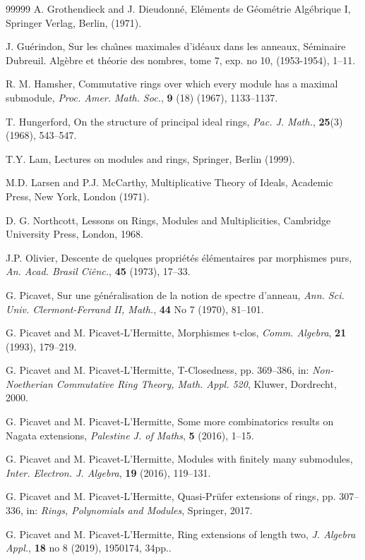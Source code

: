 \documentclass[12pt,leqno]{amsart}
\theoremstyle{definition}
\begin{document}
\begin{thebibliography}{99999}
 A. Grothendieck and J. Dieudonn\'e, El\'ements de G\'eom\'etrie Alg\'ebrique I, Springer Verlag, Berlin, (1971).

 J. Gu\'erindon, Sur les cha\^\i nes maximales d'id\'eaux dans les anneaux, S\'eminaire Dubreuil. Alg\`ebre et th\'eorie des nombres,  tome 7, exp. no 10, (1953-1954), 1--11.

 R. M. Hamsher, Commutative rings over which every module has a maximal submodule, {\it Proc. Amer. Math. Soc.}, {\bf 9} (18) (1967), 1133--1137.

 T. Hungerford, On the structure of principal ideal rings, {\it Pac. J. Math.}, {\bf 25}(3) (1968), 543--547.

 T.Y. Lam, Lectures on modules and rings, Springer, Berlin  (1999).

 M.D. Larsen and P.J. McCarthy, Multiplicative Theory of  Ideals, Academic Press, New York, London (1971).

 D. G. Northcott, Lessons on Rings, Modules and Multiplicities, Cambridge University Press, London, 1968.

 J.P. Olivier, Descente de quelques propri\'et\'es 
\'el\'ementaires par morphismes purs, {\it An. Acad. Brasil Ci\^enc.}, {\bf 45}  (1973), 17--33.

 G. Picavet, Sur une g\'en\'eralisation de la notion de spectre  d'anneau, {\it Ann. Sci. Univ. Clermont-Ferrand II, Math.}, {\bf 44}  No 7 (1970), 81--101. 

 G. Picavet and M. Picavet-L'Hermitte, Morphismes t-clos, {\it Comm. Algebra}, {\bf 21} (1993), 179--219.

 G. Picavet and M. Picavet-L'Hermitte, T-Closedness, pp. 369--386, in: {\it Non-Noetherian Commutative Ring Theory, Math. Appl. 520}, Kluwer, Dordrecht, 2000.

 G. Picavet and M. Picavet-L'Hermitte, Some more combinatorics results on Nagata extensions, {\it Palestine J. of Maths}, {\bf 5} (2016), 1--15.

 G. Picavet and M. Picavet-L'Hermitte,  Modules with finitely many submodules, {\it Inter. Electron. J. Algebra}, {\bf 19} (2016), 119--131.

 G. Picavet and M. Picavet-L'Hermitte, Quasi-Pr\"ufer extensions of rings, pp. 307--336, in: {\it Rings, Polynomials and Modules}, Springer, 2017.

 G. Picavet and M. Picavet-L'Hermitte, Ring extensions of length two,  {\it J. Algebra Appl.}, {\bf 18}  no 8 (2019), 1950174, 34pp.. 


\end{thebibliography}
\end{document}
